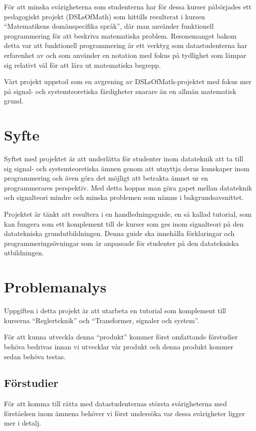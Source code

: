 \documentclass{article}
\begin{document}
För att minska svårigheterna som studenterna har för dessa kurser
påbörjades ett pedagogiskt projekt (DSLsOfMath) som hittills
resulterat i kursen “Matematikens domänspecifika språk”, där man
använder funktionell programmering för att beskriva matematiska problem.
Resonemanget bakom detta var att funktionell programmering är ett
verktyg som datastudenterna har erfarenhet av och som använder en
notation med fokus på tydlighet som lämpar sig relativt väl för
att lära ut matematiska begrepp.

Vårt projekt uppstod som en avgrening av DSLsOfMath-projektet med
fokus mer på signal- och systemteoretiska färdigheter snarare än
en allmän matematisk grund.

\section{Syfte}
Syftet med projektet är att underlätta för studenter inom datateknik
att ta till sig signal- och systemteoretiska ämnen genom att utnyttja
deras kunskaper inom programmering och även göra det möjligt att
betrakta ämnet ur en programmerares perspektiv.
Med detta hoppas man göra gapet mellan datateknik och
signalteori mindre och minska problemen som nämns i
bakgrundsavsnittet.

Projektet är tänkt att resultera i en handledningsguide, en så kallad
tutorial, som kan fungera som ett komplement till de kurser som ges
inom signalteori på den datatekniska grundutbildningen. Denna guide ska innehålla förklaringar och programmeringsövningar som är anpassade för studenter på den datatekniska utbildningen.
\section{Problemanalys}
Uppgiften i detta projekt är att utarbeta en tutorial som
komplement till kurserna “Reglerteknik” och “Transformer, signaler och
system”.

För att kunna utveckla denna ``produkt'' kommer först omfattande
förstudier behöva bedrivas innan vi utvecklar vår produkt och denna
produkt kommer sedan behöva testas.


\subsection{Förstudier}
För att komma till rätta med datastudenternas största svårigheterna
med förståelsen inom ämnena behöver vi först undersöka var dessa
svårigheter ligger mer i detalj.
\end{document}
